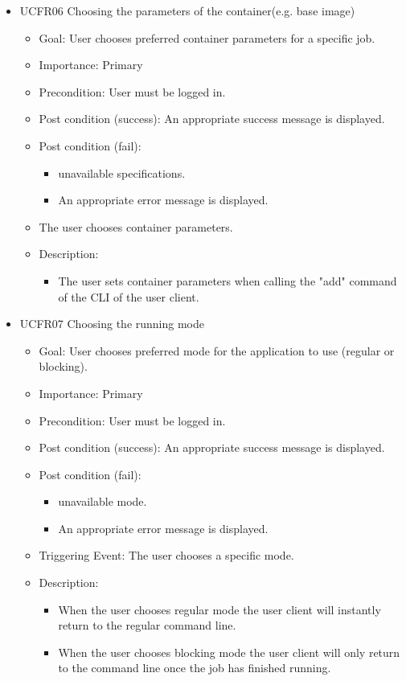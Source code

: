 \begin{itemize}
    \item  UCFR06 Choosing the parameters of the container(e.g. base image)
    \begin{itemize}
      \item Goal: User chooses preferred container parameters for a specific job.
      \item Importance: Primary
      \item Precondition: User must be logged in.
      \item Post condition (success): An appropriate success message is displayed.
      \item Post condition (fail):
      \begin{itemize}
        \item unavailable specifications.
        \item An appropriate error message is displayed.
      \end{itemize}
      \item The user chooses container parameters.
      \item Description:
      \begin{itemize}
        \item The user sets container parameters when calling the "add" command of the CLI of the user client.
      \end{itemize}
    \end{itemize}

    \item  UCFR07 Choosing the running mode
    \begin{itemize}
      \item Goal: User chooses preferred mode for the application to use (regular or blocking).
      \item Importance: Primary
      \item Precondition: User must be logged in.
      \item Post condition (success): An appropriate success message is displayed.
      \item Post condition (fail):
      \begin{itemize}
        \item unavailable mode.
        \item An appropriate error message is displayed.
      \end{itemize}
      \item Triggering Event: The user chooses a specific mode.
      \item Description:
      \begin{itemize}
        \item When the user chooses regular mode the user client will instantly return to the regular command line.
        \item When the user chooses blocking mode the user client will only return to the command line once the job has finished running.
      \end{itemize}
    \end{itemize}


\end{itemize}

